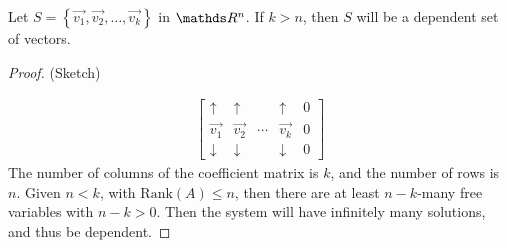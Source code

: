\documentclass[11pt]{article}
\newcommand{\vek}[1]{\vec{#1}}
\begin{document}
\begin{theorem}
Let $S = \left\{ \vek{v_1}, \vek{v_2}, \dots, \vek{v_k} \right\}$ in $\bbR^n$. If $k > n$, then $S$ will be a dependent set of vectors.
\end{theorem}
\begin{proof}(Sketch)

\begin{align*}
\left[\begin{matrix}
\uparrow & \uparrow & & \uparrow & 0
\\
\vek{v_1} & \vek{v_2} & \cdots & \vek{v_k} & 0
\\
\downarrow & \downarrow & & \downarrow & 0
\end{matrix}\right]
\end{align*}
The number of columns of the coefficient matrix is $k$, and the number of rows is $n$. Given $n < k$, with $\text{Rank}(A) \le n$, then there are at least $n-k$-many free variables with $n-k > 0$. Then the system will have infinitely many solutions, and thus be dependent.

\end{proof}
\end{document}
